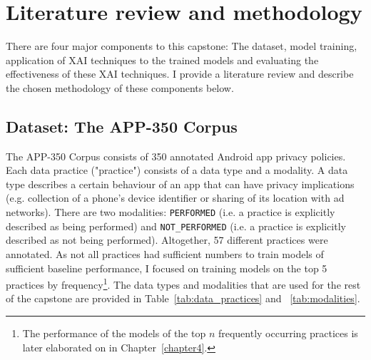 \chapter{Literature review and methodology} %
\label{chapter2} %

\newcommand{\keyword}[1]{\textbf{#1}}
\newcommand{\tabhead}[1]{\textbf{#1}}
\newcommand{\code}[1]{\texttt{#1}}
\newcommand{\file}[1]{\texttt{\bfseries#1}}
\newcommand{\option}[1]{\texttt{\itshape#1}}


There are four major components to this capstone: The dataset, model training, application of XAI techniques to the trained models and evaluating the effectiveness of these XAI techniques. I provide a literature review and describe the chosen methodology of these components below.

\section{Dataset: The APP-350 Corpus}
\label{app350_corpus}
The APP-350 Corpus consists of 350 annotated Android app privacy policies. Each data practice ("practice") consists of a data type and a modality. A data type describes a certain behaviour of an app that can have privacy implications (e.g. collection of a phone's device identifier or sharing of its location with ad networks). There are two modalities: \texttt{PERFORMED} (i.e. a practice is explicitly described as being performed) and \texttt{NOT\_PERFORMED} (i.e. a practice is explicitly described as not being performed). Altogether, 57 different practices were annotated. As not all practices had sufficient numbers to train models of sufficient baseline performance, I focused on training models on the top 5 practices by frequency\footnote{The performance of the models of the top $n$ frequently occurring practices is later elaborated on in Chapter~\ref{chapter4}.}. The data types and modalities that are used for the rest of the capstone are provided in Table~\ref{tab:data_practices} and ~\ref{tab:modalities}.

